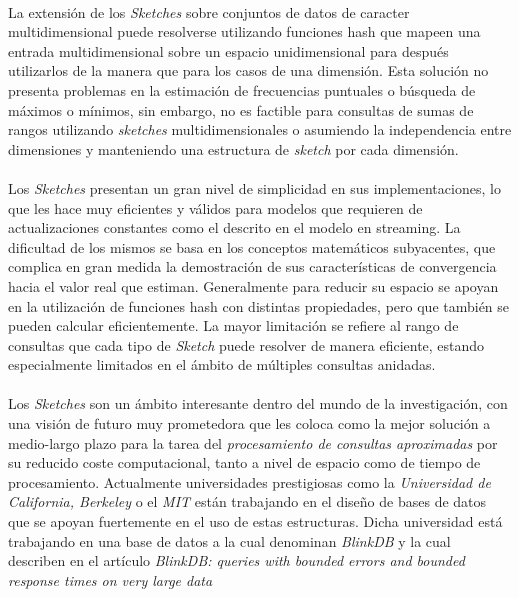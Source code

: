 \documentclass{subfiles}
\begin{document}
        \paragraph{}
        La extensión de los \emph{Sketches} sobre conjuntos de datos de caracter multidimensional puede resolverse utilizando funciones hash que mapeen una entrada multidimensional sobre un espacio unidimensional para después utilizarlos de la manera que para los casos de una dimensión. Esta solución no presenta problemas en la estimación de frecuencias puntuales o búsqueda de máximos o mínimos, sin embargo, no es factible para consultas de sumas de rangos utilizando \emph{sketches} multidimensionales o asumiendo la independencia entre dimensiones y manteniendo una estructura de \emph{sketch} por cada dimensión.

        \paragraph{}
        Los \emph{Sketches} presentan un gran nivel de simplicidad en sus implementaciones, lo que les hace muy eficientes y válidos para modelos que requieren de actualizaciones constantes como el descrito en el modelo en streaming. La dificultad de los mismos se basa en los conceptos matemáticos subyacentes, que complica en gran medida la demostración de sus características de convergencia hacia el valor real que estiman. Generalmente para reducir su espacio se apoyan en la utilización de funciones hash con distintas propiedades, pero que también se pueden calcular eficientemente. La mayor limitación se refiere al rango de consultas que cada tipo de \emph{Sketch} puede resolver de manera eficiente, estando especialmente limitados en el ámbito de múltiples consultas anidadas.

        \paragraph{}
        Los \emph{Sketches} son un ámbito interesante dentro del mundo de la investigación, con una visión de futuro muy prometedora que les coloca como la mejor solución a medio-largo plazo para la tarea del \emph{procesamiento de consultas aproximadas} por su reducido coste computacional, tanto a nivel de espacio como de tiempo de procesamiento. Actualmente universidades prestigiosas como la \emph{Universidad de California, Berkeley} o el \emph{MIT} están trabajando en el diseño de bases de datos que se apoyan fuertemente en el uso de estas estructuras. Dicha universidad está trabajando en una base de datos a la cual denominan \emph{BlinkDB} y la cual describen en el artículo \emph{BlinkDB: queries with bounded errors and bounded response times on very large data} \cite{agarwal2013blinkdb}
\end{document}
